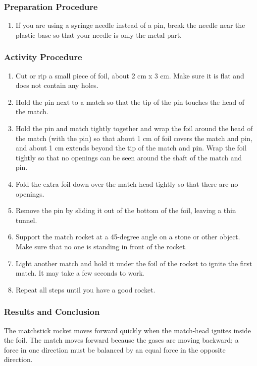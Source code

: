 \subsubsection*{Preparation Procedure}
\begin{enumerate}
\item{If you are using a syringe needle instead of a pin, break the needle near the plastic base so that your needle is only the metal part.} 
\end{enumerate}

\subsubsection*{Activity Procedure}
\begin{enumerate}
\item{Cut or rip a small piece of foil, about 2 cm x 3 cm. Make sure it is flat and does not contain any holes.} 
\item{Hold the pin next to a match so that the tip of the pin touches the head of the match.} 
\item{Hold the pin and match tightly together and wrap the foil around the head of the match (with the pin) so that about 1 cm of foil covers the match and pin, and about 1 cm extends beyond the tip of the match and pin. Wrap the foil tightly so that no openings can be seen around the shaft of the match and pin.} 
\item{Fold the extra foil down over the match head tightly so that there are no openings.} 
\item{Remove the pin by sliding it out of the bottom of the foil, leaving a thin tunnel.} 
\item{Support the match rocket at a 45-degree angle on a stone or other object. Make sure that no one is standing in front of the rocket.} 
\item{Light another match and hold it under the foil of the rocket to ignite the first match. It may take a few seconds to work.} 
\item{Repeat all steps until you have a good rocket.} 
\end{enumerate}

\subsubsection*{Results and Conclusion}
The matchstick rocket moves forward quickly when the match-head ignites inside the foil.  The match moves forward because the gases are moving backward; a force in one direction must be balanced by an equal force in the opposite direction.  

